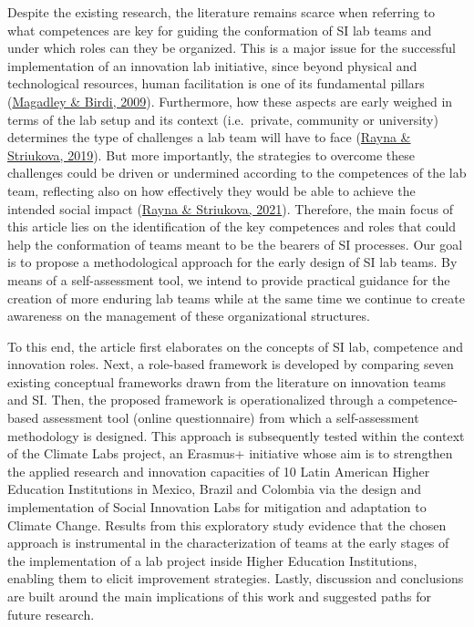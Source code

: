 \documentclass[]{elsarticle} %
\begin{document}
Despite the existing research, the literature remains scarce when
referring to what competences are key for guiding the conformation of SI
lab teams and under which roles can they be organized. This is a major
issue for the successful implementation of an innovation lab initiative,
since beyond physical and technological resources, human facilitation is
one of its fundamental pillars
(\protect\hyperlink{ref-Magadley2009}{Magadley \& Birdi, 2009}).
Furthermore, how these aspects are early weighed in terms of the lab
setup and its context (i.e.~private, community or university) determines
the type of challenges a lab team will have to face
(\protect\hyperlink{ref-Rayna2019}{Rayna \& Striukova, 2019}). But more
importantly, the strategies to overcome these challenges could be driven
or undermined according to the competences of the lab team, reflecting
also on how effectively they would be able to achieve the intended
social impact (\protect\hyperlink{ref-Rayna2021}{Rayna \& Striukova,
2021}). Therefore, the main focus of this article lies on the
identification of the key competences and roles that could help the
conformation of teams meant to be the bearers of SI processes. Our goal
is to propose a methodological approach for the early design of SI lab
teams. By means of a self-assessment tool, we intend to provide
practical guidance for the creation of more enduring lab teams while at
the same time we continue to create awareness on the management of these
organizational structures.

To this end, the article first elaborates on the concepts of SI lab,
competence and innovation roles. Next, a role-based framework is
developed by comparing seven existing conceptual frameworks drawn from
the literature on innovation teams and SI. Then, the proposed framework
is operationalized through a competence-based assessment tool (online
questionnaire) from which a self-assessment methodology is designed.
This approach is subsequently tested within the context of the Climate
Labs project, an Erasmus+ initiative whose aim is to strengthen the
applied research and innovation capacities of 10 Latin American Higher
Education Institutions in Mexico, Brazil and Colombia via the design and
implementation of Social Innovation Labs for mitigation and adaptation
to Climate Change. Results from this exploratory study evidence that the
chosen approach is instrumental in the characterization of teams at the
early stages of the implementation of a lab project inside Higher
Education Institutions, enabling them to elicit improvement strategies.
Lastly, discussion and conclusions are built around the main
implications of this work and suggested paths for future research.
\end{document}
